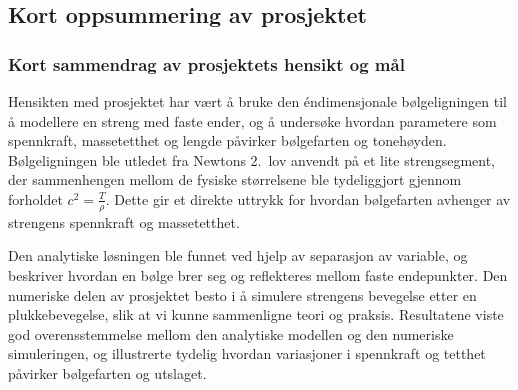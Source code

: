 \subsection{Kort oppsummering av prosjektet}

\subsubsection{Kort sammendrag av prosjektets hensikt og mål}

Hensikten med prosjektet har vært å bruke den éndimensjonale bølgeligningen til å modellere en streng med faste ender, 
og å undersøke hvordan parametere som spennkraft, massetetthet og lengde påvirker bølgefarten og tonehøyden. 
Bølgeligningen ble utledet fra Newtons 2.~lov anvendt på et lite strengsegment, der sammenhengen mellom de fysiske størrelsene ble tydeliggjort gjennom forholdet 
$c^2 = \tfrac{T}{\rho}$. Dette gir et direkte uttrykk for hvordan bølgefarten avhenger av strengens spennkraft og massetetthet.  

Den analytiske løsningen ble funnet ved hjelp av separasjon av variable, og beskriver hvordan en bølge brer seg og reflekteres mellom faste endepunkter. 
Den numeriske delen av prosjektet besto i å simulere strengens bevegelse etter en plukkebevegelse, slik at vi kunne sammenligne teori og praksis. 
Resultatene viste god overensstemmelse mellom den analytiske modellen og den numeriske simuleringen, og illustrerte tydelig hvordan variasjoner i spennkraft og tetthet påvirker bølgefarten og utslaget.  

